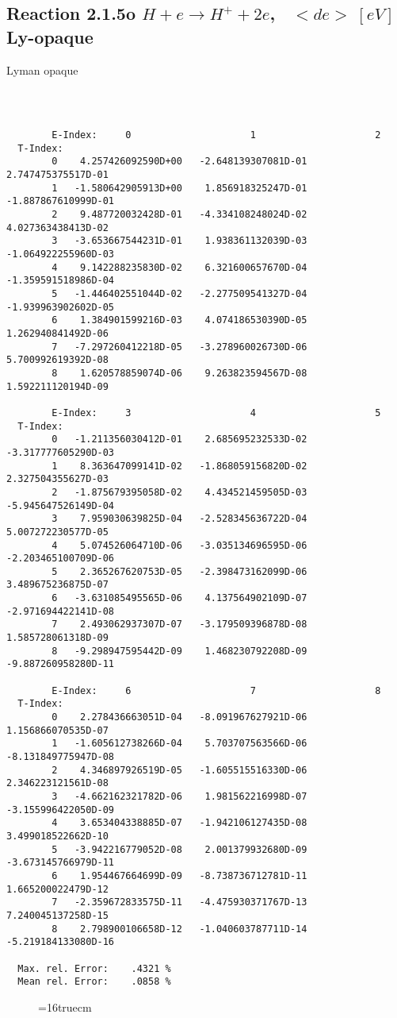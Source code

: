 \documentclass[12pt,dvipdfmx]{article}
\begin{document}
\subsection{
Reaction 2.1.5o  $ H + e \rightarrow H^+ + 2e    $, \   $<de> \ [eV]$ Ly-opaque}

Lyman opaque

\begin{small}\begin{verbatim}



        E-Index:     0                     1                     2
  T-Index:
        0    4.257426092590D+00   -2.648139307081D-01    2.747475375517D-01
        1   -1.580642905913D+00    1.856918325247D-01   -1.887867610999D-01
        2    9.487720032428D-01   -4.334108248024D-02    4.027363438413D-02
        3   -3.653667544231D-01    1.938361132039D-03   -1.064922255960D-03
        4    9.142288235830D-02    6.321600657670D-04   -1.359591518986D-04
        5   -1.446402551044D-02   -2.277509541327D-04   -1.939963902602D-05
        6    1.384901599216D-03    4.074186530390D-05    1.262940841492D-06
        7   -7.297260412218D-05   -3.278960026730D-06    5.700992619392D-08
        8    1.620578859074D-06    9.263823594567D-08    1.592211120194D-09

        E-Index:     3                     4                     5
  T-Index:
        0   -1.211356030412D-01    2.685695232533D-02   -3.317777605290D-03
        1    8.363647099141D-02   -1.868059156820D-02    2.327504355627D-03
        2   -1.875679395058D-02    4.434521459505D-03   -5.945647526149D-04
        3    7.959030639825D-04   -2.528345636722D-04    5.007272230577D-05
        4    5.074526064710D-06   -3.035134696595D-06   -2.203465100709D-06
        5    2.365267620753D-05   -2.398473162099D-06    3.489675236875D-07
        6   -3.631085495565D-06    4.137564902109D-07   -2.971694422141D-08
        7    2.493062937307D-07   -3.179509396878D-08    1.585728061318D-09
        8   -9.298947595442D-09    1.468230792208D-09   -9.887260958280D-11

        E-Index:     6                     7                     8
  T-Index:
        0    2.278436663051D-04   -8.091967627921D-06    1.156866070535D-07
        1   -1.605612738266D-04    5.703707563566D-06   -8.131849775947D-08
        2    4.346897926519D-05   -1.605515516330D-06    2.346223121561D-08
        3   -4.662162321782D-06    1.981562216998D-07   -3.155996422050D-09
        4    3.653404338885D-07   -1.942106127435D-08    3.499018522662D-10
        5   -3.942216779052D-08    2.001379932680D-09   -3.673145766979D-11
        6    1.954467664699D-09   -8.738736712781D-11    1.665200022479D-12
        7   -2.359672833575D-11   -4.475930371767D-13    7.240045137258D-15
        8    2.798900106658D-12   -1.040603787711D-14   -5.219184133080D-16

  Max. rel. Error:    .4321 %
  Mean rel. Error:    .0858 %

\end{verbatim}\end{small}
\begin{figure} \label{2.1.5li2o}
\epsfxsize=16truecm
\end{figure}
\newpage
\end{document}
